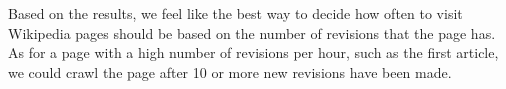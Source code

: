 \documentclass[a4paper,11pt,oneside]{book}
\begin{document}
\begin{enumerate}
\begin{description}
		\end{description}

	Based on the results, we feel like the best way to decide how often to visit Wikipedia pages should be based on the number of revisions that the page has.  As for a page with a high number of revisions per hour, such as the first article, we could crawl the page after 10 or more new revisions have been made. 
 \end {enumerate}






\end{document}
